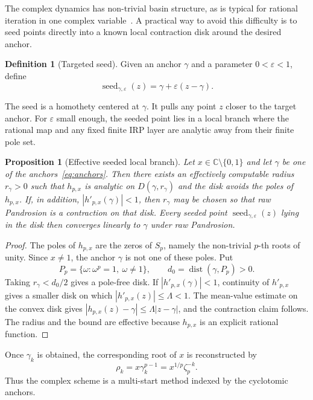 \documentclass[10pt,a4paper]{article}
\theoremstyle{plain}
\newtheorem{proposition}[theorem]{Proposition}
\theoremstyle{definition}
\newtheorem{definition}[theorem]{Definition}
\theoremstyle{remark}
\newcommand{\C}{\mathbb{C}}
\newcommand{\eps}{\varepsilon}
\newcommand{\dist}{\operatorname{dist}}
\begin{document}
The complex dynamics has non-trivial basin structure, as is typical for rational
iteration in one complex variable~\cite{milnor}.  A practical way to avoid
this difficulty is to seed points directly into a known local contraction disk
around the desired anchor.

\begin{definition}[Targeted seed]
Given an anchor $\gamma$ and a parameter $0<\eps<1$, define
\[
  \operatorname{seed}_{\gamma,\eps}(z)
  =\gamma+\eps(z-\gamma).
\]
\end{definition}

The seed is a homothety centered at $\gamma$.  It pulls any point $z$ closer to
the target anchor.  For $\eps$ small enough, the seeded point lies in a local branch where the rational map and any fixed finite IRP layer are analytic away from their finite pole set.


\begin{proposition}[Effective seeded local branch]
\label{prop:effective-seeded-complex}
Let $x\in\C\setminus\{0,1\}$ and let $\gamma$ be one of the anchors~\eqref{eq:anchors}.
Then there exists an effectively computable radius $r_\gamma>0$ such that
$h_{p,x}$ is analytic on $D(\gamma,r_\gamma)$ and the disk avoids the poles of
$h_{p,x}$.  If, in addition, $|h'_{p,x}(\gamma)|<1$, then $r_\gamma$ may be
chosen so that raw Pandrosion is a contraction on that disk.  Every seeded
point $\operatorname{seed}_{\gamma,\eps}(z)$ lying in the disk then converges
linearly to $\gamma$ under raw Pandrosion.
\end{proposition}

\begin{proof}
The poles of $h_{p,x}$ are the zeros of $S_p$, namely the non-trivial $p$-th
roots of unity.  Since $x\ne1$, the anchor $\gamma$ is not one of these poles.
Put
\[
  P_p=\{\omega:\omega^p=1,\ \omega\ne1\},
  \qquad d_0=\dist(\gamma,P_p)>0.
\]
Taking $r_\gamma<d_0/2$ gives a pole-free disk.  If
$|h'_{p,x}(\gamma)|<1$, continuity of $h'_{p,x}$ gives a smaller disk on which
$|h'_{p,x}(z)|\le\Lambda<1$.  The mean-value estimate on the convex disk gives
$|h_{p,x}(z)-\gamma|\le\Lambda|z-
\gamma|$, and the contraction claim follows.  The radius and the bound are
effective because $h_{p,x}$ is an explicit rational function.
\end{proof}

Once $\gamma_k$ is obtained, the corresponding root of $x$ is reconstructed by
\[
  \rho_k=x\gamma_k^{p-1}=x^{1/p}\zeta_p^{-k}.
\]
Thus the complex scheme is a multi-start method indexed by the cyclotomic
anchors.
\end{document}
